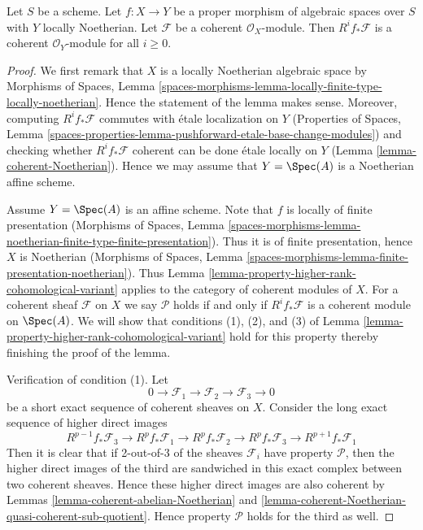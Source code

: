 %
\begin{lemma}
\label{lemma-proper-pushforward-coherent}
Let $S$ be a scheme. Let $f : X \to Y$ be a proper morphism
of algebraic spaces over $S$ with $Y$ locally Noetherian.
Let $\mathcal{F}$ be a coherent $\mathcal{O}_X$-module.
Then $R^if_*\mathcal{F}$ is a coherent $\mathcal{O}_Y$-module
for all $i \geq 0$.
\end{lemma}

\begin{proof}
We first remark that $X$ is a locally Noetherian algebraic space
by Morphisms of Spaces, Lemma
\ref{spaces-morphisms-lemma-locally-finite-type-locally-noetherian}.
Hence the statement of the lemma makes sense. Moreover, computing
$R^if_*\mathcal{F}$ commutes with \'etale localization on $Y$
(Properties of Spaces, Lemma
\ref{spaces-properties-lemma-pushforward-etale-base-change-modules})
and checking whether $R^if_*\mathcal{F}$ coherent can be done
\'etale locally on $Y$ (Lemma \ref{lemma-coherent-Noetherian}).
Hence we may assume that $Y = \Spec(A)$ is a Noetherian affine scheme.

\medskip\noindent
Assume $Y = \Spec(A)$ is an affine scheme. Note that $f$ is locally
of finite presentation
(Morphisms of Spaces, Lemma
\ref{spaces-morphisms-lemma-noetherian-finite-type-finite-presentation}).
Thus it is of finite presentation, hence $X$ is Noetherian
(Morphisms of Spaces, Lemma
\ref{spaces-morphisms-lemma-finite-presentation-noetherian}).
Thus Lemma \ref{lemma-property-higher-rank-cohomological-variant}
applies to the category of coherent modules of $X$.
For a coherent sheaf $\mathcal{F}$ on $X$ we say $\mathcal{P}$ holds
if and only if $R^if_*\mathcal{F}$ is a coherent module on $\Spec(A)$.
We will show that conditions (1), (2), and (3) of
Lemma \ref{lemma-property-higher-rank-cohomological-variant} hold
for this property thereby finishing the proof of the lemma.

\medskip\noindent
Verification of condition (1). Let
$$
0 \to \mathcal{F}_1 \to \mathcal{F}_2 \to \mathcal{F}_3 \to 0
$$
be a short exact sequence of coherent sheaves on $X$.
Consider the long exact sequence of higher direct images
$$
R^{p - 1}f_*\mathcal{F}_3 \to
R^pf_*\mathcal{F}_1 \to
R^pf_*\mathcal{F}_2 \to
R^pf_*\mathcal{F}_3 \to
R^{p + 1}f_*\mathcal{F}_1
$$
Then it is clear that if 2-out-of-3 of the sheaves $\mathcal{F}_i$
have property $\mathcal{P}$, then the higher direct images of the
third are sandwiched in this exact complex between two coherent
sheaves. Hence these higher direct images are also coherent by
Lemmas \ref{lemma-coherent-abelian-Noetherian} and
\ref{lemma-coherent-Noetherian-quasi-coherent-sub-quotient}.
Hence property $\mathcal{P}$ holds for the third as well.


\end{proof}
